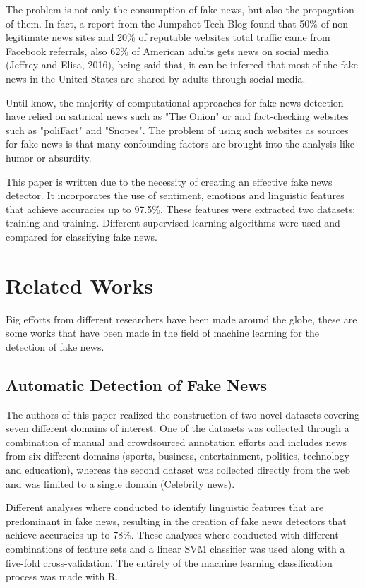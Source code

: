 \documentclass[runningheads]{llncs}
\begin{document}
The problem is not only the consumption of fake news, but also the propagation of them. In fact, a report from the Jumpshot Tech Blog found that 50\% of non-legitimate news sites and 20\% of reputable websites total traffic came from Facebook referrals, also 62\% of American adults gets news on social media (Jeffrey and Elisa, 2016), being said that, it can be inferred that most of the fake news in the United States are shared by adults through social media. 

Until know, the majority of computational approaches for fake news detection have relied on satirical news such as "The Onion" or and fact-checking websites such as "poliFact" and "Snopes". The problem of using such websites as sources for fake news is that many confounding factors are brought into the analysis like humor or absurdity.

This paper is written due to the necessity of creating an effective fake news detector. It incorporates the use of sentiment, emotions and linguistic features that achieve accuracies up to 97.5\%. These features were extracted two datasets: training and training. Different supervised learning algorithms were used and compared for classifying fake news.

\section{Related Works}
Big efforts from different researchers have been made around the globe, these are some works that have been made in the field of machine learning for the detection of fake news.

\subsection{Automatic Detection of Fake News}
The authors of this paper realized the construction of two novel datasets covering seven different domains of interest. One of the datasets was collected through a combination of manual and crowdsourced annotation efforts and includes news from six different domains (sports, business, entertainment, politics, technology and education), whereas the second dataset was collected directly from the web and was limited to a single domain (Celebrity news). 

Different analyses where conducted to identify linguistic features that are predominant in fake news, resulting in the creation of fake news detectors that achieve accuracies up to 78\%. These analyses where conducted with different combinations of feature sets and a linear SVM classifier was used along with a five-fold cross-validation. The entirety of the machine learning classification process was made with R. 
\end{document}
